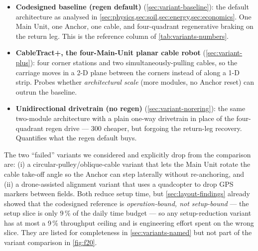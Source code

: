 \documentclass[11pt,a4paper]{article}
\begin{document}
\begin{itemize}[leftmargin=1.6em,itemsep=0.15em]
    \item \textbf{Codesigned baseline (regen default)} (\cref{sec:variant-baseline}): the default architecture as analysed in \cref{sec:physics,sec:soil,sec:energy,sec:economics}. One Main Unit, one Anchor, one cable, and four-quadrant regenerative braking on the return leg. This is the reference column of \cref{tab:variants-numbers}.
    \item \textbf{CableTract+, the four-Main-Unit planar cable robot} (\cref{sec:variant-plus}): four corner stations and two simultaneously-pulling cables, so the carriage moves in a 2-D plane between the corners instead of along a 1-D strip. Probes whether \emph{architectural scale} (more modules, no Anchor reset) can outrun the baseline.
    \item \textbf{Unidirectional drivetrain (no regen)} (\cref{sec:variant-norering}): the same two-module architecture with a plain one-way drivetrain in place of the four-quadrant regen drive --- \SI{300}{\EUR} cheaper, but forgoing the return-leg recovery. Quantifies what the regen default buys.
\end{itemize}

The two ``failed'' variants we considered and explicitly drop from the comparison are: (i) a circular-pulley/oblique-cable variant that lets the Main Unit rotate the cable take-off angle so the Anchor can step laterally without re-anchoring, and (ii) a drone-assisted alignment variant that uses a quadcopter to drop GPS markers between fields. Both reduce setup time, but \cref{sec:layout-findings} already showed that the codesigned reference is \emph{operation-bound, not setup-bound} --- the setup slice is only 9\,\% of the daily time budget --- so any setup-reduction variant has at most a 9\,\% throughput ceiling and is engineering effort spent on the wrong slice. They are listed for completeness in \cref{sec:variants-named} but not part of the variant comparison in \cref{fig:f20}.
\end{document}
